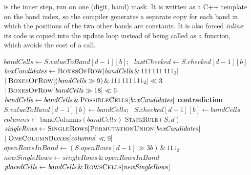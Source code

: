 \documentclass[11pt]{article}
\theoremstyle{definition}
\theoremstyle{plain}
\let\origtextsc\textsc
\renewcommand{\textsc}[1]{\textup{\origtextsc{#1}}}
\begin{document}
 is the inner step, run on one (digit, band) mask. It is written as a C++ template on the band index, so the compiler generates a separate copy for each band in which
the positions of the two other bands are constants. It is also forced \emph{inline}: its code is copied into the update
loop instead of being called as a function, which avoids the cost of a call.

\begin{algorithm}[H]
\caption{\textsc{UpdateBand}$_b(S, d)$: band rule, stack rule and row singles for digit $d$ in band $b$}
\label{alg:band}
\begin{algorithmic}[1]
\State $\mathit{bandCells} \gets S.\mathit{valueToBand}[d-1][b]$; \ $\mathit{lastChecked} \gets S.\mathit{checked}[d-1][b]$
\State $\mathit{boxCandidates} \gets \textsc{BoxesOfRow}[\mathit{bandCells} \,\&\, 111\,111\,111_2]$
  \Statex \hspace{\algorithmicindent}\hspace{\algorithmicindent}$\mid \textsc{BoxesOfRow}[(\mathit{bandCells}\gg 9)\,\&\,111\,111\,111_2]\ll 3$
  \Statex \hspace{\algorithmicindent}\hspace{\algorithmicindent}$\mid \textsc{BoxesOfRow}[\mathit{bandCells}\gg 18]\ll 6$ 
\State $\mathit{bandCells} \gets \mathit{bandCells} \,\&\, \textsc{PossibleCells}[\mathit{boxCandidates}]$ 
 \Return \textbf{contradiction} \EndIf
\State $S.\mathit{valueToBand}[d-1][b] \gets \mathit{bandCells}$; \ $S.\mathit{checked}[d-1][b] \gets \mathit{bandCells}$
\State $\mathit{columns} \gets \mathrm{bandColumns}(\mathit{bandCells})$
 \textsc{StackRule}$(S, d)$ \EndIf
\State $\mathit{singleRows} \gets \textsc{SingleRows}[\textsc{PermutationUnion}[\mathit{boxCandidates}]$
  \Statex \hspace{\algorithmicindent}\hspace{\algorithmicindent}$\mid \textsc{OneColumnBoxes}[\mathit{columns}]\ll 9]$
\State $\mathit{openRowsInBand} \gets (S.\mathit{openRows}[d-1] \gg 3b) \,\&\, 111_2$ 
  \Statex \hspace{\algorithmicindent}$\mathit{newSingleRows} \gets \mathit{singleRows} \,\&\, \mathit{openRowsInBand}$
  \State $\mathit{placedCells} \gets \mathit{bandCells} \,\&\, \textsc{RowsCells}[\mathit{newSingleRows}]$ 

\end{algorithmic}
\end{algorithm}
\end{document}
